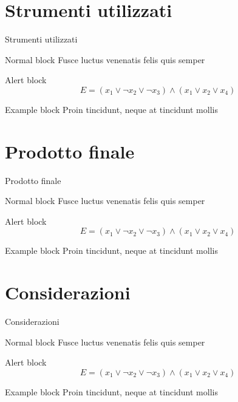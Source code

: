 \documentclass{beamer}
\begin{document}
	\section{Strumenti utilizzati}

	\begin{frame}{Strumenti utilizzati}
		\begin{block}{Normal block}
			Fusce luctus venenatis felis quis semper
		\end{block}

		\begin{alertblock}{Alert block}
			$$ E = (x_1 \vee \neg x_2 \vee \neg x_3) \wedge (x_1 \vee x_2 \vee x_4) $$
		\end{alertblock}

		\begin{exampleblock}{Example block}
			Proin tincidunt, neque at tincidunt mollis
		\end{exampleblock}
	\end{frame}
	
	\section{Prodotto finale}

	\begin{frame}{Prodotto finale}
		\begin{block}{Normal block}
			Fusce luctus venenatis felis quis semper
		\end{block}

		\begin{alertblock}{Alert block}
			$$ E = (x_1 \vee \neg x_2 \vee \neg x_3) \wedge (x_1 \vee x_2 \vee x_4) $$
		\end{alertblock}

		\begin{exampleblock}{Example block}
			Proin tincidunt, neque at tincidunt mollis
		\end{exampleblock}
	\end{frame}
	
	\section{Considerazioni}

	\begin{frame}{Considerazioni}
		\begin{block}{Normal block}
			Fusce luctus venenatis felis quis semper
		\end{block}

		\begin{alertblock}{Alert block}
			$$ E = (x_1 \vee \neg x_2 \vee \neg x_3) \wedge (x_1 \vee x_2 \vee x_4) $$
		\end{alertblock}

		\begin{exampleblock}{Example block}
			Proin tincidunt, neque at tincidunt mollis
		\end{exampleblock}
	\end{frame}
	
\end{document}
